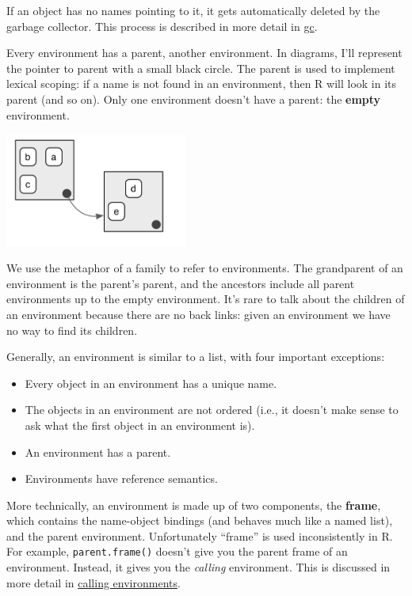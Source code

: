 If an object has no names pointing to it, it gets automatically deleted
by the garbage collector. This process is described in more detail in
\hyperref[gc]{gc}.

Every environment has a parent, another environment. In diagrams, I'll
represent the pointer to parent with a small black circle. The parent is
used to implement lexical scoping: if a name is not found in an
environment, then R will look in its parent (and so on). Only one
environment doesn't have a parent: the \textbf{empty} environment.

\includegraphics[width=2.36in]{diagrams/environments.png/parents.png}

We use the metaphor of a family to refer to environments. The
grandparent of an environment is the parent's parent, and the ancestors
include all parent environments up to the empty environment. It's rare
to talk about the children of an environment because there are no back
links: given an environment we have no way to find its children.

Generally, an environment is similar to a list, with four important
exceptions:

\begin{itemize}
\item
  Every object in an environment has a unique name.
\item
  The objects in an environment are not ordered (i.e., it doesn't make
  sense to ask what the first object in an environment is).
\item
  An environment has a parent.
\item
  Environments have reference semantics.
\end{itemize}

More technically, an environment is made up of two components, the
\textbf{frame}, which contains the name-object bindings (and behaves
much like a named list), and the parent environment. Unfortunately
``frame'' is used inconsistently in R. For example,
\texttt{parent.frame()} doesn't give you the parent frame of an
environment. Instead, it gives you the \emph{calling} environment. This
is discussed in more detail in \hyperref[calling-environments]{calling
environments}.  

